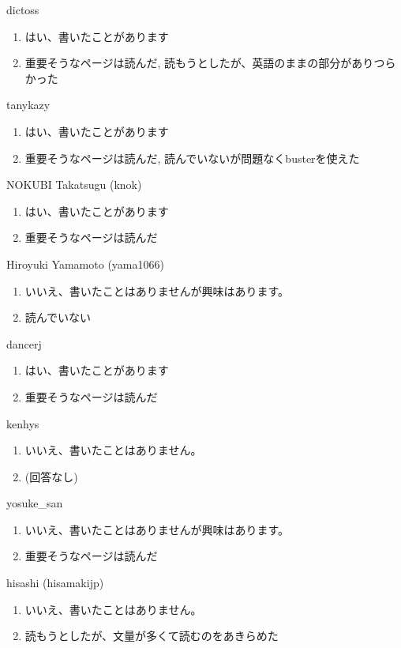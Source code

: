 \begin{prework}{ dictoss }
  \begin{enumerate}
  \item はい、書いたことがあります
  \item 重要そうなページは読んだ, 読もうとしたが、英語のままの部分がありつらかった
  \end{enumerate}
\end{prework}

\begin{prework}{ tanykazy }
  \begin{enumerate}
  \item はい、書いたことがあります
  \item 重要そうなページは読んだ, 読んでいないが問題なくbusterを使えた
  \end{enumerate}
\end{prework}

\begin{prework}{ NOKUBI Takatsugu (knok) }
  \begin{enumerate}
  \item はい、書いたことがあります
  \item 重要そうなページは読んだ
  \end{enumerate}
\end{prework}

\begin{prework}{ Hiroyuki Yamamoto (yama1066) }
  \begin{enumerate}
  \item いいえ、書いたことはありませんが興味はあります。
  \item 読んでいない
  \end{enumerate}
\end{prework}

\begin{prework}{ dancerj }
  \begin{enumerate}
  \item はい、書いたことがあります
  \item 重要そうなページは読んだ
  \end{enumerate}
\end{prework}

\begin{prework}{ kenhys }
  \begin{enumerate}
  \item いいえ、書いたことはありません。
  \item (回答なし)
  \end{enumerate}
\end{prework}

\begin{prework}{ yosuke\_san }
  \begin{enumerate}
  \item いいえ、書いたことはありませんが興味はあります。
  \item 重要そうなページは読んだ
  \end{enumerate}
\end{prework}

\begin{prework}{ hisashi (hisamakijp) }
  \begin{enumerate}
  \item いいえ、書いたことはありません。
  \item 読もうとしたが、文量が多くて読むのをあきらめた
  \end{enumerate}
\end{prework}

